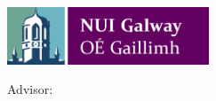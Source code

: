 \pagestyle{empty}
\begin{center}

\centerline{\mbox{\includegraphics[width=60mm]{assets/Logo_NUIG.pdf}}}

\bigskip

{\large \ThesisUniversity}

{\ThesisDept}

\vfill

{\bfseries\Huge \ThesisTitle}

\medskip

{\Large \ThesisType}

\vspace{2cm}

{\bfseries\large \ThesisAuthor}

\medskip

{\large Advisor: \ThesisAdvisor}

\vspace{2cm}

{\large \ThesisPurpose}

\medskip

{\large \ThesisDegree}

\vspace{2cm}

{\bfseries\monthyear\ThesisDate}

\end{center}

\cleardoublepage

\pagestyle{fancy}
